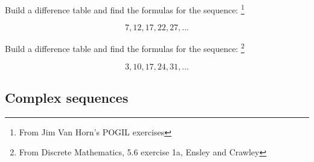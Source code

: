     \newpage
    
    \begin{questionNOGRADE}{\thequestion}
        Build a difference table and find the formulas for the sequence:
        \footnote{From Jim Van Horn's POGIL exercises}

        $$ 7, 12, 17, 22, 27, ... $$
    \end{questionNOGRADE}

    \vspace{6cm}

    \begin{questionNOGRADE}{\thequestion}
        Build a difference table and find the formulas for the sequence:
        \footnote{From Discrete Mathematics, 5.6 exercise 1a, Ensley and Crawley}

        $$ 3, 10, 17, 24, 31, ... $$
        
    \end{questionNOGRADE}

    \newpage

    \subsection{Complex sequences}

